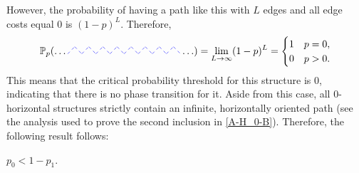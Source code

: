         \noindent However, the probability of having a path like this with $L$ edges and all edge costs equal 0 is $(1 - p)^L$. Therefore,
        \[
            \Pbb_p(\ldots \begin{tikzpicture}[scale=0.5pt]
                    \def\aa{-5}
                    \def\bb{2}
                        \foreach \x in {\aa, ..., \bb} {
                            \draw[dashed, thin, color = blue] (\x, 0) -- (\x + 0.5, 0.5);
                            \draw[dashed, thin, color = blue] (\x + 0.5, 0.5) -- (\x + 1, 0.0);
                        }
                \end{tikzpicture} \ldots) = \lim_{L \to \infty} (1 - p)^L = \begin{cases}
                                                                            1   &   p = 0, \\
                                                                            0   &   p > 0. 
                                                                        \end{cases}
       \]
       This means that the critical probability threshold for this structure is 0, indicating that there is no phase transition for it. Aside from this case, all 0-horizontal structures strictly contain an infinite, horizontally oriented path (see the analysis used to prove the second inclusion in \eqref{A-H_0-B}). Therefore, the following result follows:

        \begin{proposition} \label{theorem-relation-p0-p1}
            $p_0 < 1-p_1$.
        \end{proposition}
 

